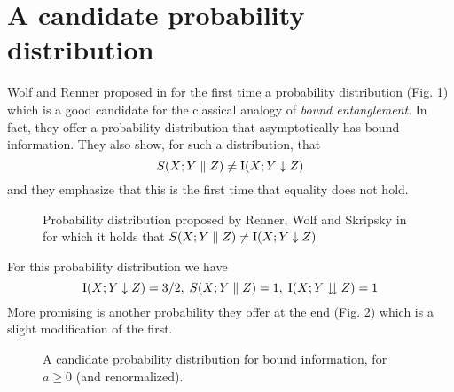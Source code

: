 \section{A candidate probability distribution}
    Wolf and Renner proposed in \cite{RW03} for the first time a probability distribution (Fig. \ref{Tab:candidate}) which is a good candidate for the classical analogy of \emph{bound entanglement}. 
    In fact, they offer a probability distribution that asymptotically has bound information. 
    They also show, for such a distribution, that 
    \begin{equation}
    	S(X;Y\parallel Z) \neq \operatorname{I}(X;Y\downarrow Z)
    \end{equation}  
     and they emphasize that this is the first time that equality does not hold.\\
     
	\begin{figure}[h!]
		
	    \caption{Probability distribution proposed by Renner, Wolf and Skripsky in \cite{RW03} for which it holds that $S(X;Y\parallel Z) \neq \operatorname{I}(X;Y\downarrow Z)$}
	    \label{Tab:candidate}
	\end{figure}	 
	
		For this probability distribution we have
	$$ \operatorname{I}(X;Y\downarrow Z) = 3/2 ,\; S(X;Y\parallel Z) = 1 , \; \operatorname{I}(X;Y\downdownarrows Z) = 1 $$
	More promising is another probability they offer at the end (Fig. \ref{Tab:candidate2}) which is a slight modification of the first.
	
	
	\begin{figure}
		
	    	
	    	\caption{A candidate probability distribution for bound information, for $a\geq 0$ (and renormalized).}
	    	\label{Tab:candidate2}
	\end{figure}
    